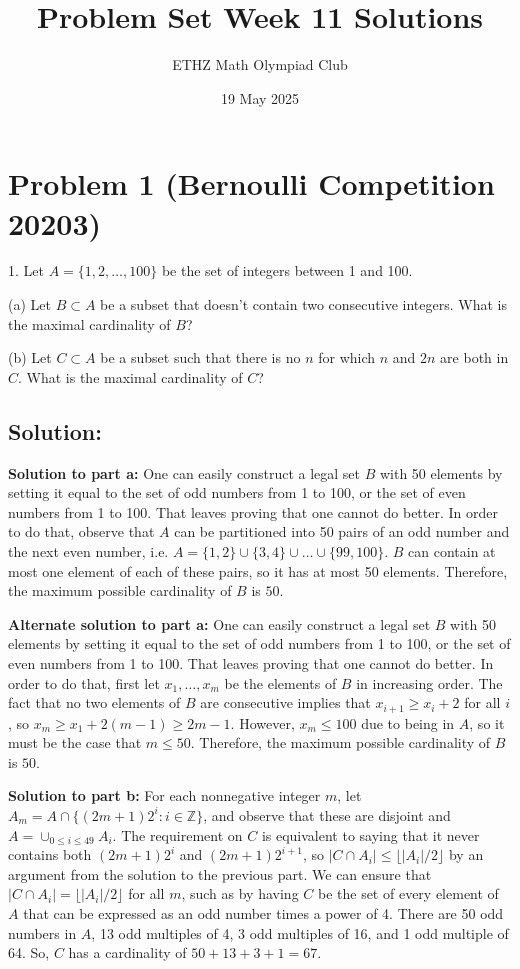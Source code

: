 \documentclass[11pt, a4paper, oneside]{article}
\title{Problem Set Week 11 Solutions}
\author{ETHZ Math Olympiad Club}
\date{19 May 2025}
\newcommand{\problem}[1][]{\section{#1} \hfill \par}
\newcommand{\solution}[1][]{\subsection*{#1}\hfill \par}
\theoremstyle{remark}
\theoremstyle{lemma}
\begin{document}
\maketitle
\problem[Problem 1 (Bernoulli Competition 20203)]
1. Let \( A = \{1, 2, \ldots, 100\} \) be the set of integers between 1 and 100.

(a) Let \( B \subset A \) be a subset that doesn't contain two consecutive integers. What is the maximal cardinality of \( B \)?

(b) Let \( C \subset A \) be a subset such that there is no \( n \) for which \( n \) and \( 2n \) are both in \( C \). What is the maximal cardinality of \( C \)?

\solution[Solution:]
\textbf{Solution to part a:} One can easily construct a legal set \( B \) with 50 elements by setting it equal to the set of odd numbers from 1 to 100, or the set of even numbers from 1 to 100. That leaves proving that one cannot do better. In order to do that, observe that \( A \) can be partitioned into 50 pairs of an odd number and the next even number, i.e. \( A = \{1, 2\} \cup \{3, 4\} \cup \ldots \cup \{99, 100\} \). \( B \) can contain at most one element of each of these pairs, so it has at most 50 elements. Therefore, the maximum possible cardinality of \( B \) is \(\boxed{50}\).

\textbf{Alternate solution to part a:} One can easily construct a legal set \( B \) with 50 elements by setting it equal to the set of odd numbers from 1 to 100, or the set of even numbers from 1 to 100. That leaves proving that one cannot do better. In order to do that, first let \( x_1, \ldots, x_m \) be the elements of \( B \) in increasing order. The fact that no two elements of \( B \) are consecutive implies that \( x_{i+1} \geq x_i + 2 \) for all \( i \), so \( x_m \geq x_1 + 2(m-1) \geq 2m-1 \). However, \( x_m \leq 100 \) due to being in \( A \), so it must be the case that \( m \leq 50 \). Therefore, the maximum possible cardinality of \( B \) is \(\boxed{50}\).

\textbf{Solution to part b:} For each nonnegative integer \( m \), let \( A_m = A \cap \{(2m+1)2^i : i \in \mathbb{Z}\} \), and observe that these are disjoint and \( A = \cup_{0 \leq i \leq 49} A_i \). The requirement on \( C \) is equivalent to saying that it never contains both \((2m+1)2^i\) and \((2m+1)2^{i+1}\), so \( |C \cap A_i| \leq \lfloor |A_i|/2 \rfloor \) by an argument from the solution to the previous part. We can ensure that \( |C \cap A_i| = \lfloor |A_i|/2 \rfloor \) for all \( m \), such as by having \( C \) be the set of every element of \( A \) that can be expressed as an odd number times a power of 4. There are 50 odd numbers in \( A \), 13 odd multiples of 4, 3 odd multiples of 16, and 1 odd multiple of 64. So, \( C \) has a cardinality of \( 50 + 13 + 3 + 1 = \boxed{67} \).
\end{document}
